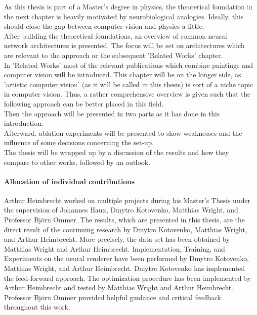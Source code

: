 As this thesis is part of a Master's degree in physics, the theoretical foundation in the next chapter is heavily motivated by neurobiological analogies.
Ideally, this should close the gap between computer vision and physics a little.\\
After building the theoretical foundations, an overview of common neural network architectures is presented.
The focus will be set on architectures which are relevant to the approach or the subsequent 'Related Works' chapter.\\
In 'Related Works' most of the relevant publications which combine paintings and computer vision will be introduced.
This chapter will be on the longer side, as 'artistic computer vision' (as it will be called in this thesis) is sort of a niche topic in computer vision.
Thus, a rather comprehensive overview is given such that the following approach can be better placed in this field.\\
Then the approach will be presented in two parts as it has done in this introduction. \\
Afterward, ablation experiments will be presented to show weaknesses and the influence of some decisions concerning the set-up.\\
The thesis will be wrapped up by a discussion of the results and how they compare to other works, followed by an outlook.

\paragraph{Allocation of individual contributions}
Arthur Heimbrecht worked on multiple projects during his Master's Thesis under the supervision of Johannes Haux, Dmytro Kotovenko, Matthias Wright, and Professor Björn Ommer.
The results, which are presented in this thesis, are the direct result of the continuing research by Dmytro Kotovenko, Matthias Wright, and Arthur Heimbrecht.
More precisely, the data set has been obtained by Matthias Wright and Arthur Heimbrecht.
Implementation, Training, and Experiments on the neural renderer have been performed by Dmytro Kotovenko, Matthias Wright, and Arthur Heimbrecht.
Dmytro Kotovenko has implemented the feed-forward approach.
The optimization procedure has been implemented by Arthur Heimbrecht and tested by Matthias Wright and Arthur Heimbrecht.
Professor Björn Ommer provided helpful guidance and critical feedback throughout this work.
